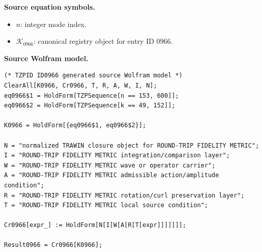\begin{minipage}[t]{0.49\linewidth}
\begingroup
\small
\raggedright
\textbf{Source equation symbols.}\par
\begin{itemize}[leftmargin=1.35em,itemsep=1pt,topsep=1pt,parsep=0pt]
    \item $n$: integer mode index.
    \item $\mathcal{K}_{0966}$: canonical registry object for entry ID 0966.
\end{itemize}
\endgroup
\end{minipage}\hfill
\begin{minipage}[t]{0.47\linewidth}
\begingroup
\scriptsize
\raggedright
\textbf{Source Wolfram model.}\par
\begin{Verbatim}[fontsize=\tiny,breaklines=true,breakanywhere=true]
(* TZPID ID0966 generated source Wolfram model *)
ClearAll[K0966, Cr0966, T, R, A, W, I, N];
eq0966$1 = HoldForm[TZPSequence[n == 153, 600]];
eq0966$2 = HoldForm[TZPSequence[k == 49, 152]];

K0966 = HoldForm[{eq0966$1, eq0966$2}];

N = "normalized TRAWIN closure object for ROUND-TRIP FIDELITY METRIC";
I = "ROUND-TRIP FIDELITY METRIC integration/comparison layer";
W = "ROUND-TRIP FIDELITY METRIC wave or operator carrier";
A = "ROUND-TRIP FIDELITY METRIC admissible action/amplitude condition";
R = "ROUND-TRIP FIDELITY METRIC rotation/curl preservation layer";
T = "ROUND-TRIP FIDELITY METRIC local source condition";

Cr0966[expr_] := HoldForm[N[I[W[A[R[T[expr]]]]]]];

Result0966 = Cr0966[K0966];
\end{Verbatim}
\endgroup
\end{minipage}

